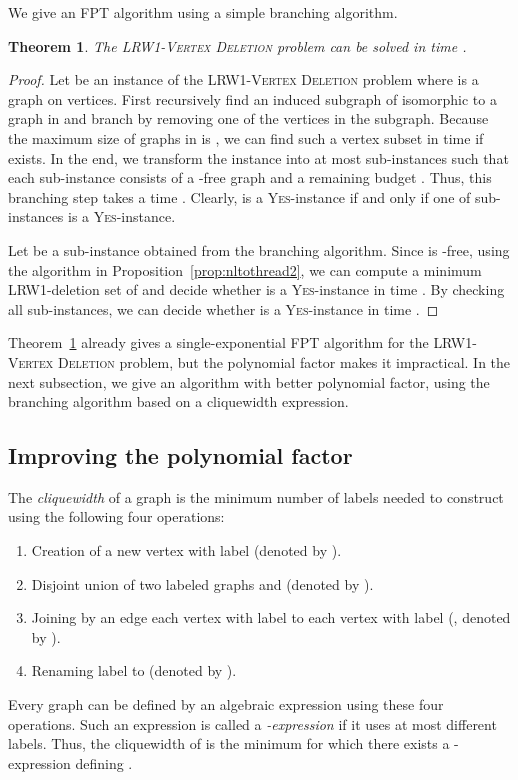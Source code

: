 \documentclass[11pt]{article}
\newtheorem{theorem}{Theorem}[section]
\theoremstyle{remark}
\newcommand{\LRWD}{\textsc{LRW1-Vertex Deletion} }
\begin{document}
We give an FPT algorithm using a simple branching algorithm.

\begin{theorem}\label{thm:algorithm1}
The \LRWD problem can be solved in time .
\end{theorem}

\begin{proof}
Let  be an instance of the \LRWD problem where  is a graph on  vertices. 
First recursively find an induced subgraph of  isomorphic to a graph in  and branch by removing one of the vertices in the subgraph.
Because the maximum size of graphs in  is ,
we can find such a vertex subset in time  if exists.
In the end,
we transform the instance  into at most  sub-instances  such that each sub-instance consists of a -free graph  and a remaining budget . 
Thus, this branching step takes a time . 
Clearly,  is a \textsc{Yes}-instance if and only if one of sub-instances  is a \textsc{Yes}-instance.



Let  be a sub-instance obtained from the branching algorithm.
Since  is -free, 
using the algorithm in Proposition~\ref{prop:nltothread2}, 
we can compute a minimum LRW1-deletion set of  and decide whether  is a \textsc{Yes}-instance in time .
By checking all sub-instances, we can decide whether  is a \textsc{Yes}-instance in time . 
\end{proof}
Theorem~\ref{thm:algorithm1} already gives a single-exponential FPT algorithm for the \LRWD problem, but the polynomial factor  makes it impractical.
In the next subsection, we give an algorithm with better polynomial factor, using the branching algorithm based on a cliquewidth expression.

\subsection{Improving the polynomial factor}


The \emph{cliquewidth} of a graph  is the minimum number of labels needed to construct  using the following four operations:
\begin{enumerate}[(1)]
\item Creation of a new vertex  with label  (denoted by ).
\item Disjoint union of two labeled graphs  and  (denoted by ).
\item Joining by an edge each vertex with label  to each vertex with label  (, denoted by ). 
\item Renaming label  to  (denoted by ).
\end{enumerate}
Every graph can be defined by an algebraic expression using these four operations. 
Such an expression is called a \emph{-expression} if it uses at most  different labels. Thus, the cliquewidth of  is the minimum  for which there exists a -expression defining .
\end{document}
